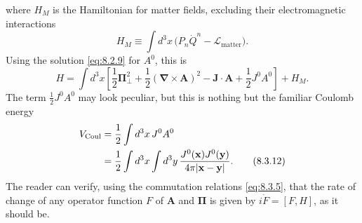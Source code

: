 
where $H_M$ is the Hamiltonian for matter fields, excluding their
electromagnetic interactions
\[
H_M\equiv\int d^3x\,
  \bigl(P_n\dot Q^n-\mathcal L_{\mathrm{matter}}\bigr).
\]
Using the solution \eqref{eq:8.2.9} for $A^0$, this is
\begin{equation}
H=\int d^3x\left[
  \frac12\boldsymbol{\Pi}_{\!\perp}^{2}
  +\frac12(\boldsymbol\nabla\times\mathbf A)^2
  -\mathbf J\cdot\mathbf A+\frac12J^0A^0
\right]+H_M.
\tag{8.3.11}\label{eq:8.3.11}
\end{equation}
The term $\frac12J^0A^0$ may look peculiar, but this is nothing but the
familiar Coulomb energy
\begin{align}
V_{\mathrm{Coul}}
&=\frac12\int d^3x\,J^0A^0
\notag\\
&=\frac12\int d^3x\int d^3y\,
  \frac{J^0(\mathbf x)J^0(\mathbf y)}{4\pi\lvert\mathbf x-\mathbf y\rvert}.
\tag{8.3.12}\label{eq:8.3.12}
\end{align}
The reader can verify, using the commutation relations \eqref{eq:8.3.5}, that the
rate of change of any operator function $F$ of $\mathbf A$ and
$\boldsymbol\Pi$ is given by $i\dot F=[F,H]$, as it should be.
